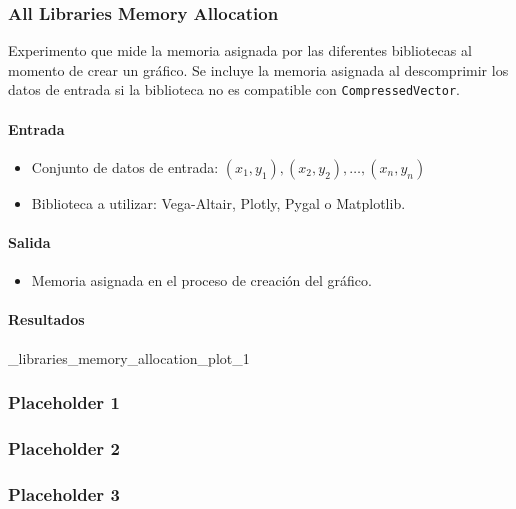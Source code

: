 \subsubsection{All Libraries Memory Allocation}
\label{all_libraries_memory_allocation}

Experimento que mide la memoria asignada por las diferentes bibliotecas al momento de crear un gráfico. Se incluye la memoria asignada al descomprimir los datos de entrada si la biblioteca no es compatible con \texttt{CompressedVector}.

\paragraph{Entrada}
\begin{itemize}
    \item Conjunto de datos de entrada: \( (x_1, y_1), (x_2, y_2), \ldots, (x_n, y_n) \)
    \item Biblioteca a utilizar: Vega-Altair, Plotly, Pygal o Matplotlib.
\end{itemize}

\paragraph{Salida}
\begin{itemize}
    \item Memoria asignada en el proceso de creación del gráfico.
\end{itemize}

\paragraph{Resultados}

\all_libraries_memory_allocation_plot_1


\subsubsection{Placeholder 1}
\label{vega_altair_plot_time}

\subsubsection{Placeholder 2}
\label{pygal_plot_time}

\subsubsection{Placeholder 3}
\label{vega_altair_plot_plus_build_time}

